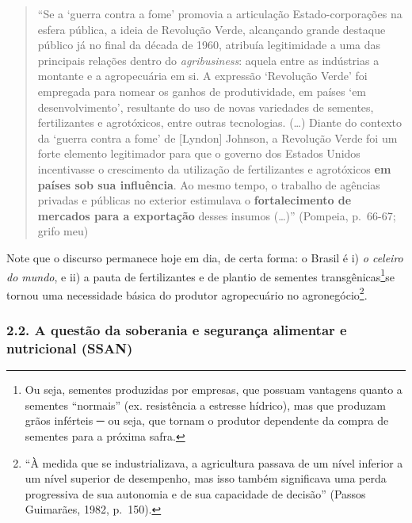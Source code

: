 \documentclass[12pt]{article}
\numberwithin{equation}{section}
\theoremstyle{plain}
\theoremstyle{definition}
\theoremstyle{remark}
\begin{document}
\begin{quote}
``Se a `guerra contra a fome' promovia a articulação Estado-corporações na esfera pública, a ideia de Revolução Verde, alcançando grande destaque público já no final da década de 1960, atribuía legitimidade a uma das principais relações dentro do \textit{agribusiness}: aquela entre as indústrias a montante e a agropecuária em si. A expressão `Revolução Verde' foi empregada para nomear os ganhos de produtividade, em países `em desenvolvimento', resultante do uso de novas variedades de sementes, fertilizantes e agrotóxicos, entre outras tecnologias. (\ldots) Diante do contexto da `guerra contra a fome' de {[}Lyndon{]} Johnson, a Revolução Verde foi um forte elemento legitimador para que o governo dos Estados Unidos incentivasse o crescimento da utilização de fertilizantes e agrotóxicos \textbf{em países sob sua influência}. Ao mesmo tempo, o trabalho de agências privadas e públicas no exterior estimulava o \textbf{fortalecimento de mercados para a exportação} desses insumos (\ldots)'' (Pompeia, p.~66-67; grifo meu)
\end{quote}

Note que o discurso permanece hoje em dia, de certa forma: o Brasil é i) \textit{o celeiro do mundo}, e ii) a pauta de fertilizantes e de plantio de sementes transgênicas\footnote{Ou seja, sementes produzidas por empresas, que possuam vantagens quanto a sementes ``normais'' (ex. resistência a estresse hídrico), mas que produzam grãos inférteis ─ ou seja, que tornam o produtor dependente da compra de sementes para a próxima safra.}se tornou uma necessidade básica do produtor agropecuário no agronegócio\footnote{``À medida que se industrializava, a agricultura passava de um nível inferior a um nível superior de desempenho, mas isso também significava uma perda progressiva de sua autonomia e de sua capacidade de decisão'' (Passos Guimarães, 1982, p.~150).}.

\hypertarget{a-questuxe3o-da-soberania-e-seguranuxe7a-alimentar-e-nutricional-ssan}{%
\subsubsection{2.2. A questão da soberania e segurança alimentar e nutricional (SSAN)}\label{a-questuxe3o-da-soberania-e-seguranuxe7a-alimentar-e-nutricional-ssan}}
\end{document}
